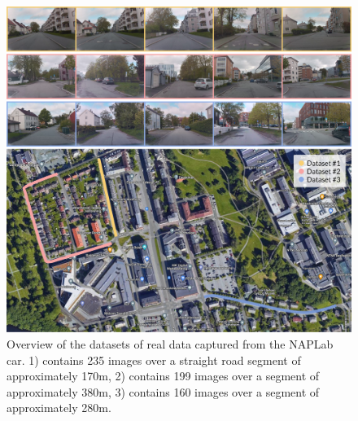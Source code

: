 \begin{figure}[h]
    \centering
    \includegraphics[width=1.0\textwidth]{figures/naplab-dataset.png}
    \caption[The datasets captured from the NAPLab car.]{Overview of the datasets of real data captured from the NAPLab car. 1) contains 235 images over a straight road segment of approximately 170m, 2) contains 199 images over a segment of approximately 380m, 3) contains 160 images over a segment of approximately 280m.}
    \label{fig:naplab-dataset}
\end{figure}